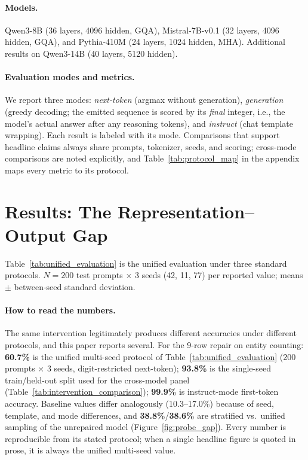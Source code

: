 \documentclass{article}
\begin{document}
\paragraph{Models.}
Qwen3-8B (36 layers, 4096 hidden, GQA), Mistral-7B-v0.1 (32 layers, 4096
hidden, GQA), and Pythia-410M (24 layers, 1024 hidden, MHA). Additional
results on Qwen3-14B (40 layers, 5120 hidden).

\paragraph{Evaluation modes and metrics.}
We report three modes: \emph{next-token} (argmax without generation),
\emph{generation} (greedy decoding; the emitted sequence is scored by its
\emph{final} integer, i.e., the model's actual answer after any reasoning
tokens), and \emph{instruct} (chat template wrapping). Each result is labeled
with its mode. Comparisons that support headline claims always share prompts,
tokenizer, seeds, and scoring; cross-mode comparisons are noted
explicitly, and Table~\ref{tab:protocol_map} in the appendix maps every metric
to its protocol.

\section{Results: The Representation--Output Gap}
\label{sec:results}

Table~\ref{tab:unified_evaluation} is the unified evaluation under three
standard protocols. $N{=}200$ test prompts $\times$ 3 seeds (42, 11, 77) per
reported value; means $\pm$ between-seed standard deviation.

\paragraph{How to read the numbers.}
The same intervention legitimately produces different accuracies under different protocols, and this paper reports several. For the 9-row repair on entity counting: \textbf{60.7\%} is the unified multi-seed protocol of Table~\ref{tab:unified_evaluation} (200 prompts $\times$ 3 seeds, digit-restricted next-token); \textbf{93.8\%} is the single-seed train/held-out split used for the cross-model panel (Table~\ref{tab:intervention_comparison}); \textbf{99.9\%} is instruct-mode first-token accuracy. Baseline values differ analogously (10.3--17.0\%) because of seed, template, and mode differences, and \textbf{38.8\%}/\textbf{38.6\%} are stratified vs.\ unified sampling of the unrepaired model (Figure~\ref{fig:probe_gap}). Every number is reproducible from its stated protocol; when a single headline figure is quoted in prose, it is always the unified multi-seed value.
\end{document}

